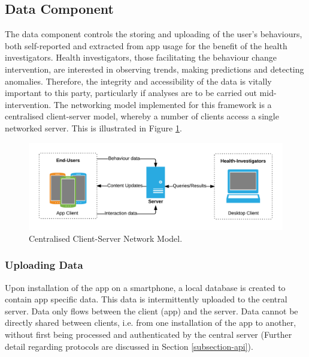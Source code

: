 \subsection{Data Component}
The data component controls the storing and uploading of the user's behaviours, both self-reported and extracted from app usage for the benefit of the health investigators. Health investigators, those facilitating the behaviour change intervention, are interested in observing trends, making predictions and detecting anomalies. Therefore, the integrity and accessibility of the data is vitally important to this party, particularly if analyses are to be carried out mid-intervention. The networking model implemented for this framework is a centralised client-server model, whereby a number of clients access a single networked server. This is illustrated in Figure \ref{fig: clientserver-model}.

\begin{figure}[h]
    \centering
    \includegraphics[scale=0.9, angle=0]{Files/prevention-study-1/figures/client-server}
    \caption{Centralised Client-Server Network Model.}
    \label{fig: clientserver-model}
\end{figure}

\subsubsection{Uploading Data}
Upon installation of the app on a smartphone, a local database is created to contain app specific data. This data is intermittently uploaded to the central server. Data only flows between the client (app) and the server. Data cannot be directly shared between clients, i.e. from one installation of the app to another, without first being processed and authenticated by the central server (Further detail regarding protocols are discussed in Section \ref{subsection-api}).

